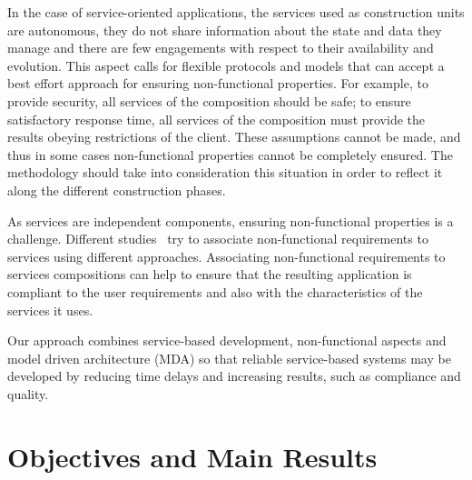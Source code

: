 {In the case of service-oriented applications, the services used as construction
units are autonomous, they do not share information about the state and data
they manage and there are few engagements with respect to their availability and
evolution. This aspect calls for flexible protocols and models that can accept a
best effort approach for ensuring non-functional properties.  For example, to
provide security, all services of the composition should be safe; to ensure
satisfactory response time, all services of the composition must provide the
results obeying restrictions of the client.  These assumptions cannot be made,
and thus in some cases non-functional properties cannot be completely ensured.
The methodology should take into consideration this situation in order to
reflect it along the different construction phases.          

}


As services are independent components, ensuring non-functional properties is a
challenge. Different
studies~\cite{Babamir2010,AgarwalLS09,CholletL09,GutierrezRF10,XiaoCZBOLH08,JeongCL09,Tsadimas:2012} try to associate non-functional requirements to services using different approaches. 
Associating non-functional requirements to services
compositions can help to ensure that the resulting application is compliant to
the user requirements and also with the characteristics of the services it uses.
 
Our approach combines service-based development, non-functional aspects and
model driven architecture (MDA) so that reliable service-based systems may be
developed by reducing time delays and increasing results, such as compliance and
quality.
% 

 

\section{Objectives and Main Results}


 
